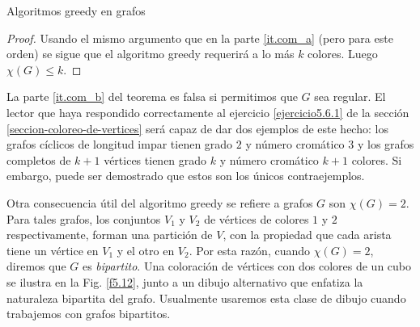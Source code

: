\begin{section}{Algoritmos greedy en grafos}
\begin{proof}
Usando el mismo argumento que en la parte \ref{it.com_a} (pero para este orden) se sigue que el algoritmo greedy requerirá a lo más $k$ colores. Luego $\chi(G)\le k$. 
\end{proof}

La parte \ref{it.com_b} del teorema es falsa si permitimos que $G$ sea regular. El lector que haya respondido correctamente al ejercicio \ref{ejercicio5.6.1} de la sección \ref{seccion-coloreo-de-vertices} será capaz de dar dos ejemplos de este hecho:  los grafos cíclicos de longitud impar tienen grado $2$ y número cromático  $3$ y los grafos completos de $k+1$ vértices tienen grado $k$ y número cromático $k+1$ colores. Si embargo, puede ser demostrado que estos son los únicos contraejemplos.

Otra consecuencia útil del algoritmo greedy se refiere a grafos $G$ son $\chi(G)=2$. Para tales grafos, los conjuntos $V_1$ y $V_2$ de vértices de colores $1$ y $2$ respectivamente, forman una partición de $V$, con la propiedad que cada arista tiene un vértice en $V_1$ y el otro en $V_2$. Por esta razón, cuando $\chi(G)=2$, diremos que $G$ es \textit{bipartito}.  Una coloración de vértices con dos colores de un cubo se ilustra en la Fig. \ref{f5.12}, junto a un dibujo alternativo que enfatiza la naturaleza bipartita del grafo. Usualmente usaremos esta clase de dibujo cuando trabajemos con grafos bipartitos.


\end{section}
